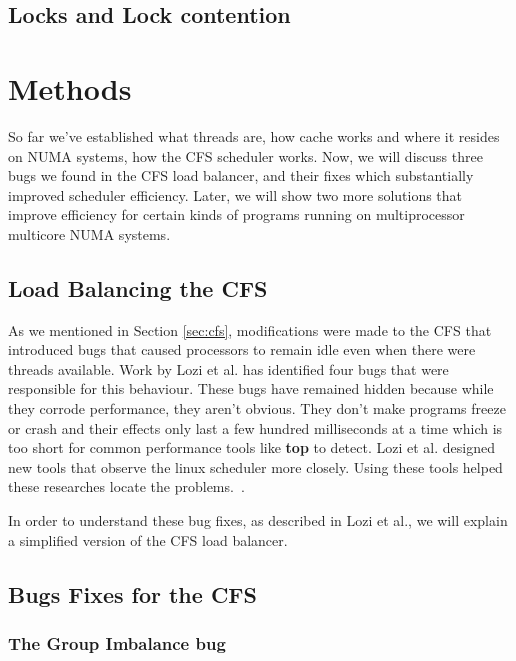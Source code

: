 \documentclass{sig-alternate}
\begin{document}
\subsection{Locks and Lock contention}
\label{sec:locks}

\section{Methods}
\label{sec:methods}

So far we've established what threads are, how cache works and where it resides on NUMA systems, how the CFS scheduler works. Now, we will discuss three bugs we found in the CFS load balancer, and their fixes which substantially improved scheduler efficiency. Later, we will show two more solutions that improve efficiency for certain kinds of programs running on multiprocessor multicore NUMA systems.

\subsection{Load Balancing the CFS}
\label{sec:loadbalance}

As we mentioned in Section \ref{sec:cfs}, modifications were made to the CFS that introduced bugs that caused processors to remain idle even when there were threads available. Work by Lozi et al. has identified four bugs that were responsible for this behaviour. These bugs have remained hidden because while they corrode performance, they aren't obvious. They don't make programs freeze or crash and their effects only last a few hundred milliseconds at a time which is too short for common performance tools like \textbf{top} to detect. Lozi et al. designed new tools that observe the linux scheduler more closely. Using these tools helped these researches locate the problems.~\cite{Lozi:2016}.

In order to understand these bug fixes, as described in Lozi et al., we will explain a simplified version of the CFS load balancer.

\subsection{Bugs Fixes for the CFS}
\label{sec:cfsbugs}



\subsubsection{The Group Imbalance bug}
\label{sec:cfsfault_grpimbalance}
\end{document}
